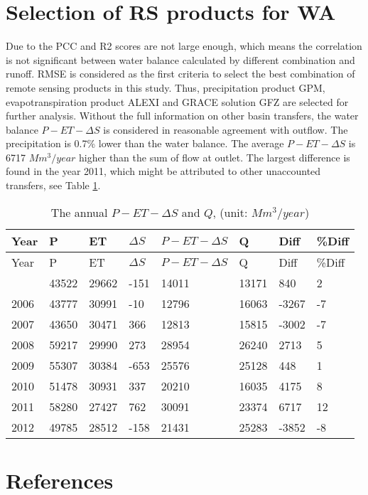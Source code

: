 \documentclass[oneside,openany]{article}%
\begin{document}
\section{Selection of RS products for WA}%
\label{sec:SelectionofRSproductsforWA}%
Due to the PCC and R2 scores are not large enough, which means the correlation is not significant between water balance calculated by different combination and runoff. RMSE is considered as the first criteria to select the best combination of remote sensing products in this study.%
\linebreak%
Thus, precipitation product GPM, evapotranspiration product ALEXI and GRACE solution GFZ are selected for further analysis.%
\linebreak%
Without the full information on other basin transfers, the water balance $P-ET-\Delta S$ is considered in reasonable agreement with outflow. The precipitation is 0.7\% lower than the water balance. The average $P-ET-\Delta S$ is 6717 $Mm^3/year$ higher than the sum of flow at outlet. The largest difference is found in the year 2011, which might be attributed to other unaccounted transfers, see Table \ref{table:tab2}.%
\linebreak%
\begin{longtable}{|l|l|l|l|l|l|l|l|}%
\caption{The annual $P-ET-\Delta S$ and $Q$, (unit: $Mm^3/year$)}%
\label{table:tab2}\\%
\hline%
\textbf{Year}&\textbf{P}&\textbf{ET}&\textbf{$\Delta S$}&\textbf{$P-ET-\Delta S$}&\textbf{Q}&\textbf{Diff}&\textbf{\%Diff}\\%
\hline%
\endfirsthead%
\hline%
Year&P&ET&$\Delta S$&$P-ET-\Delta S$&Q&Diff&\%Diff\\%
\hline%
\endhead%
\hline%
\endfoot%
2005&43522&29662&{-}151&14011&13171&840&2\\%
2006&43777&30991&{-}10&12796&16063&{-}3267&{-}7\\%
2007&43650&30471&366&12813&15815&{-}3002&{-}7\\%
2008&59217&29990&273&28954&26240&2713&5\\%
2009&55307&30384&{-}653&25576&25128&448&1\\%
2010&51478&30931&337&20210&16035&4175&8\\%
2011&58280&27427&762&30091&23374&6717&12\\%
2012&49785&28512&{-}158&21431&25283&{-}3852&{-}8\\%
\end{longtable}

%
\newpage%
\section*{References}%
\label{sec:References}%
%
\printbibliography[heading=none]
\end{document}
